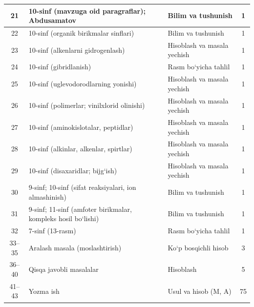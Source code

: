 \documentclass[11pt,a4paper]{article}
\begin{document}
{\begin{longtable}{|c|p{7.2cm}|p{5.4cm}|c|}
21 & 10-sinf (mavzuga oid paragraflar); Abdusamatov & Bilim va tushunish & 1\\\hline
22 & 10-sinf (organik birikmalar sinflari) & Bilim va tushunish & 1\\\hline
23 & 10-sinf (alkenlarni gidrogenlash) & Hisoblash va masala yechish & 1\\\hline
24 & 10-sinf (gibridlanish) & Rasm bo`yicha tahlil & 1\\\hline
25 & 10-sinf (uglevodorodlarning yonishi) & Hisoblash va masala yechish & 1\\\hline
26 & 10-sinf (polimerlar; vinilxlorid olinishi) & Hisoblash va masala yechish & 1\\\hline
27 & 10-sinf (aminokislotalar, peptidlar) & Hisoblash va masala yechish & 1\\\hline
28 & 10-sinf (alkinlar, alkenlar, spirtlar) & Hisoblash va masala yechish & 1\\\hline
29 & 10-sinf (disaxaridlar; bijg`ish) & Hisoblash va masala yechish & 1\\\hline
30 & 9-sinf; 10-sinf (sifat reaksiyalari, ion almashinish) & Bilim va tushunish & 1\\\hline
31 & 9-sinf; 11-sinf (amfoter birikmalar, kompleks hosil bo`lishi) & Bilim va tushunish & 1\\\hline
32 & 7-sinf (13-rasm) & Rasm bo`yicha tahlil & 1\\\hline
33--35 & Aralash masala (moslashtirish) & Ko`p bosqichli hisob & 3\\\hline
36--40 & Qisqa javobli masalalar & Hisoblash & 5\\\hline
41--43 & Yozma ish & Usul va hisob (M, A) & 75\\\hline
\end{longtable}}
\end{document}
